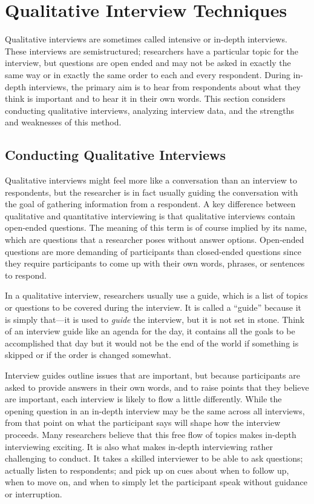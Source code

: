 \section{Qualitative Interview Techniques}

Qualitative interviews are sometimes called intensive or in-depth interviews. These interviews are semistructured; researchers have a particular topic for the interview, but questions are open ended and may not be asked in exactly the same way or in exactly the same order to each and every respondent. During in-depth interviews, the primary aim is to hear from respondents about what they think is important and to hear it in their own words. This section considers conducting qualitative interviews, analyzing interview data, and the strengths and weaknesses of this method.

\subsection{Conducting Qualitative Interviews}

Qualitative interviews might feel more like a conversation than an interview to respondents, but the researcher is in fact usually guiding the conversation with the goal of gathering information from a respondent. A key difference between qualitative and quantitative interviewing is that qualitative interviews contain open-ended questions. The meaning of this term is of course implied by its name, which are questions that a researcher poses without answer options. Open-ended questions are more demanding of participants than closed-ended questions since they require participants to come up with their own words, phrases, or sentences to respond.

In a qualitative interview, researchers usually use a guide, which is a list of topics or questions to be covered during the interview. It is called a ``guide'' because it is simply that---it is used to \textit{guide} the interview, but it is not set in stone. Think of an interview guide like an agenda for the day, it contains all the goals to be accomplished that day but it would not be the end of the world if something is skipped or if the order is changed somewhat. 

Interview guides outline issues that are important, but because participants are asked to provide answers in their own words, and to raise points that they believe are important, each interview is likely to flow a little differently. While the opening question in an in-depth interview may be the same across all interviews, from that point on what the participant says will shape how the interview proceeds. Many researchers believe that this free flow of topics makes in-depth interviewing exciting. It is also what makes in-depth interviewing rather challenging to conduct. It takes a skilled interviewer to be able to ask questions; actually listen to respondents; and pick up on cues about when to follow up, when to move on, and when to simply let the participant speak without guidance or interruption.

